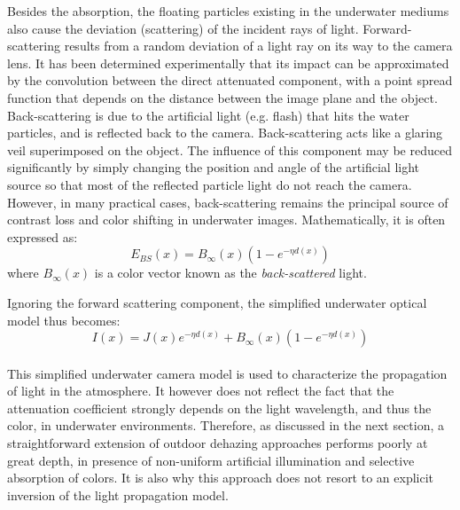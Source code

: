 \documentclass[hidelinks, 12pt]{report}
\begin{document}
Besides the absorption, the floating particles existing in the underwater mediums also cause the deviation (scattering) of the incident rays of light. Forward-scattering results from a random deviation of a light ray on its way to the camera lens. It has been determined experimentally that its impact can be approximated by the convolution between the direct attenuated component, with a point spread function that depends on the distance between the image plane and the object. Back-scattering is due to the artificial light (e.g. flash) that hits the water particles, and is reflected back to the camera. Back-scattering acts like a glaring veil superimposed on the object. The influence of this component may be reduced significantly by simply changing the position and angle of the artificial light source so that most of the reflected particle light do not reach the camera. However, in many practical cases, back-scattering remains the principal source of contrast loss and color shifting in underwater images. Mathematically, it is often expressed as:
\begin{equation}
E_{BS}(x)=B_{\infty}(x)(1-e^{-\eta d(x)})
\end{equation}
where $B_{\infty}(x)$ is a color vector known as the \textit{back-scattered} light. \par
Ignoring the forward scattering component, the simplified underwater optical model thus becomes:
\begin{equation}
I(x)=J(x)e^{-\eta d(x)}+B_{\infty}(x)(1-e^{-\eta d(x)})
\end{equation}
\paragraph{}This simplified underwater camera model is used to characterize the propagation of light in the atmosphere. It however does not reflect the fact that the attenuation coefficient strongly depends on the light wavelength, and thus the color, in underwater environments. Therefore, as discussed in the next section, a straightforward extension of outdoor dehazing approaches performs poorly at great depth, in presence of non-uniform artificial illumination and selective absorption of colors. It is also why this approach does not resort to an explicit inversion of the light propagation model.
\end{document}
